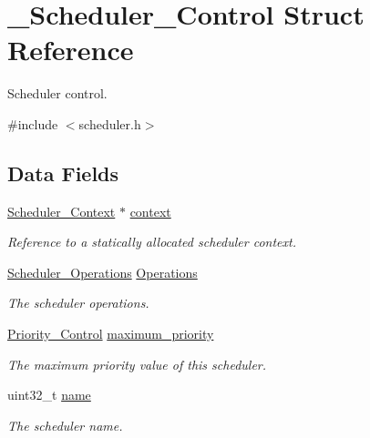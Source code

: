\hypertarget{struct__Scheduler__Control}{}\section{\+\_\+\+Scheduler\+\_\+\+Control Struct Reference}
\label{struct__Scheduler__Control}


Scheduler control.  




{\ttfamily \#include $<$scheduler.\+h$>$}

\subsection*{Data Fields}
\begin{DoxyCompactItemize}
\item 
\mbox{\label{struct__Scheduler__Control_a125b7519aa3dee15f9a6eaee96e2e79e}} 
\mbox{\hyperlink{structScheduler__Context}{Scheduler\+\_\+\+Context}} $\ast$ \mbox{\hyperlink{struct__Scheduler__Control_a125b7519aa3dee15f9a6eaee96e2e79e}{context}}
\begin{DoxyCompactList}\small\item\em Reference to a statically allocated scheduler context. \end{DoxyCompactList}\item 
\mbox{\label{struct__Scheduler__Control_a8b41258f34ef00a21aef3c587891dd4d}} 
\mbox{\hyperlink{structScheduler__Operations}{Scheduler\+\_\+\+Operations}} \mbox{\hyperlink{struct__Scheduler__Control_a8b41258f34ef00a21aef3c587891dd4d}{Operations}}
\begin{DoxyCompactList}\small\item\em The scheduler operations. \end{DoxyCompactList}\item 
\mbox{\hyperlink{group__RTEMSScorePriority_ga59d02b58072d31a9a1cfe644557aefe2}{Priority\+\_\+\+Control}} \mbox{\hyperlink{struct__Scheduler__Control_af40aafce4ff32694f7224d76b61628e1}{maximum\+\_\+priority}}
\begin{DoxyCompactList}\small\item\em The maximum priority value of this scheduler. \end{DoxyCompactList}\item 
\mbox{\label{struct__Scheduler__Control_a484e31fd2b71ab7f327ac76e12f2bfc3}} 
uint32\+\_\+t \mbox{\hyperlink{struct__Scheduler__Control_a484e31fd2b71ab7f327ac76e12f2bfc3}{name}}
\begin{DoxyCompactList}\small\item\em The scheduler name. \end{DoxyCompactList}\end{DoxyCompactItemize}


